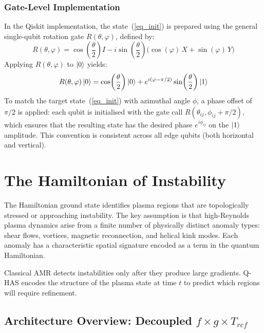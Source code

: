 \documentclass[12pt, a4paper, oneside]{report}
\begin{document}
\subsection{Gate-Level Implementation}
\label{sec:gate-level}

In the Qiskit implementation, the state~(\ref{eq_init}) is prepared using the general single-qubit rotation gate $R(\theta, \varphi)$, defined by:
\begin{equation}
    R(\theta, \varphi) = \cos\!\left(\frac{\theta}{2}\right) I - i \sin\!\left(\frac{\theta}{2}\right) \bigl(\cos(\varphi)\, X + \sin(\varphi)\, Y\bigr)
\end{equation}
Applying $R(\theta, \varphi)$ to $\ket{0}$ yields:
\begin{equation}
    R(\theta, \varphi)\ket{0} = \cos\!\left(\frac{\theta}{2}\right)\ket{0} + e^{i(\varphi - \pi/2)} \sin\!\left(\frac{\theta}{2}\right)\ket{1}
\end{equation}
To match the target state~(\ref{eq_init}) with azimuthal angle $\phi$, a phase offset of $\pi/2$ is applied: each qubit is initialised with the gate call $R(\theta_{ij}, \phi_{ij} + \pi/2)$, which ensures that the resulting state has the desired phase $e^{i\phi_{ij}}$ on the $\ket{1}$ amplitude. This convention is consistent across all edge qubits (both horizontal and vertical).


\chapter{The Hamiltonian of Instability}
\label{chap:hamiltonian}

The Hamiltonian ground state identifies plasma regions that are topologically stressed or approaching instability. The key assumption is that high-Reynolds plasma dynamics arise from a finite number of physically distinct anomaly types: shear flows, vortices, magnetic reconnection, and helical kink modes. Each anomaly has a characteristic spatial signature encoded as a term in the quantum Hamiltonian.

Classical AMR detects instabilities only after they produce large gradients. Q-HAS encodes the structure of the plasma state at time $t$ to predict which regions will require refinement.

\section{Architecture Overview: Decoupled $f \times g \times T_{rcf}$}
\label{sec:hamilt-architecture}
\end{document}
